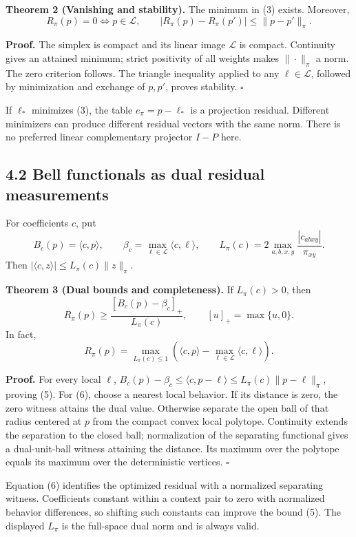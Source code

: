 \documentclass[
]{article}
\begin{document}
\textbf{Theorem 2 (Vanishing and stability).} The minimum in (3) exists. Moreover,
\[
R_\pi(p)=0\iff p\in\mathcal L,
\qquad
|R_\pi(p)-R_\pi(p')|\le\|p-p'\|_\pi.
\tag{4}
\]

\textbf{Proof.} The simplex is compact and its linear image \(\mathcal L\) is compact. Continuity gives an attained minimum; strict positivity of all weights makes \(\|\cdot\|_\pi\) a norm. The zero criterion follows. The triangle inequality applied to any \(\ell\in\mathcal L\), followed by minimization and exchange of \(p,p'\), proves stability. \(\square\)

If \(\ell_*\) minimizes (3), the table \(e_\pi=p-\ell_*\) is a projection residual. Different minimizers can produce different residual vectors with the same norm. There is no preferred linear complementary projector \(I-P\) here.

\subsection{4.2 Bell functionals as dual residual measurements}\label{bell-functionals-as-dual-residual-measurements}

For coefficients \(c\), put
\[
B_c(p)=\langle c,p\rangle,\qquad
\beta_c=\max_{\ell\in\mathcal L}\langle c,\ell\rangle,
\qquad
L_\pi(c)=2\max_{a,b,x,y}\frac{|c_{abxy}|}{\pi_{xy}}.
\]
Then \(|\langle c,z\rangle|\le L_\pi(c)\|z\|_\pi\).

\textbf{Theorem 3 (Dual bounds and completeness).} If \(L_\pi(c)>0\), then
\[
R_\pi(p)\ge
\frac{[B_c(p)-\beta_c]_+}{L_\pi(c)},
\qquad [u]_+=\max\{u,0\}.
\tag{5}
\]
In fact,
\[
R_\pi(p)=\max_{L_\pi(c)\le1}
\left(\langle c,p\rangle-\max_{\ell\in\mathcal L}\langle c,\ell\rangle\right).
\tag{6}
\]

\textbf{Proof.} For every local \(\ell\), \(B_c(p)-\beta_c\le\langle c,p-\ell\rangle\le L_\pi(c)\|p-\ell\|_\pi\), proving (5). For (6), choose a nearest local behavior. If its distance is zero, the zero witness attains the dual value. Otherwise separate the open ball of that radius centered at \(p\) from the compact convex local polytope. Continuity extends the separation to the closed ball; normalization of the separating functional gives a dual-unit-ball witness attaining the distance. Its maximum over the polytope equals its maximum over the deterministic vertices. \(\square\)

Equation (6) identifies the optimized residual with a normalized separating witness. Coefficients constant within a context pair to zero with normalized behavior differences, so shifting such constants can improve the bound (5). The displayed \(L_\pi\) is the full-space dual norm and is always valid.
\end{document}
